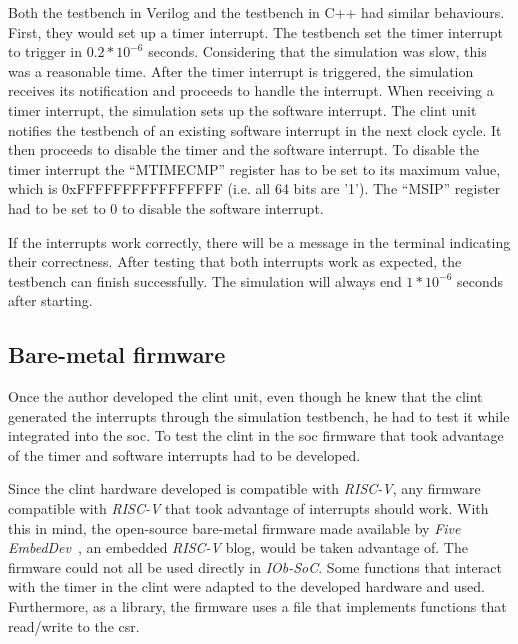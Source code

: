 Both the testbench in Verilog and the testbench in C++ had similar behaviours. First, they would set up a timer interrupt. The testbench set the timer interrupt to trigger in $0.2*10^{-6}$ seconds. Considering that the simulation was slow, this was a reasonable time. After the timer interrupt is triggered, the simulation receives its notification and proceeds to handle the interrupt. When receiving a timer interrupt, the simulation sets up the software interrupt. The \acrshort{clint} unit notifies the testbench of an existing software interrupt in the next clock cycle. It then proceeds to disable the timer and the software interrupt. To disable the timer interrupt the \enquote{MTIMECMP} register has to be set to its maximum value, which is 0xFFFFFFFFFFFFFFFF (i.e. all 64 bits are '1'). The \enquote{MSIP} register had to be set to 0 to disable the software interrupt.

If the interrupts work correctly, there will be a message in the terminal indicating their correctness. After testing that both interrupts work as expected, the testbench can finish successfully. The simulation will always end $1*10^{-6}$ seconds after starting.

\subsection{Bare-metal firmware}
Once the author developed the \acrshort{clint} unit, even though he knew that the \acrshort{clint} generated the interrupts through the simulation testbench, he had to test it while integrated into the \acrshort{soc}. To test the \acrshort{clint} in the \acrshort{soc} firmware that took advantage of the timer and software interrupts had to be developed.

Since the \acrshort{clint} hardware developed is compatible with \textit{RISC-V}, any firmware compatible with \textit{RISC-V} that took advantage of interrupts should work. With this in mind, the open-source bare-metal firmware made available by \textit{Five EmbedDev}~\cite{bare_metal_int}, an embedded \textit{RISC-V} blog, would be taken advantage of. The firmware could not all be used directly in \textit{IOb-SoC}. Some functions that interact with the timer in the \acrshort{clint} were adapted to the developed hardware and used. Furthermore, as a library, the firmware uses a file that implements functions that read/write to the \acrlong{csr}.

